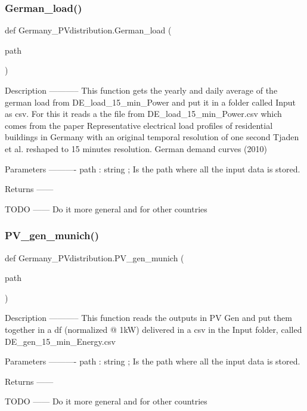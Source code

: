 \subsubsection{\texorpdfstring{German\+\_\+load()}{German\_load()}}
{\footnotesize\ttfamily def Germany\+\_\+\+P\+Vdistribution.\+German\+\_\+load (\begin{DoxyParamCaption}\item[{}]{path }\end{DoxyParamCaption})}

\begin{DoxyVerb}Description
-----------
This function gets the yearly and daily average of the german load from DE_load_15_min_Power and put it in a folder called Input as csv. For this it reads a the file from DE_load_15_min_Power.csv which comes from the paper Representative electrical load profiles of residential buildings in Germany with an original temporal resolution of one second Tjaden et al. reshaped to 15 minutes resolution. German demand curves (2010)

Parameters
----------
path : string ; Is the path where all the input data is stored.

Returns
------

TODO
------
Do it more general and for other countries
\end{DoxyVerb}
 \mbox{\label{namespace_germany___p_vdistribution_ad3081c58ad3af6f4cec1676bd4b5f585}} 
\subsubsection{\texorpdfstring{P\+V\+\_\+gen\+\_\+munich()}{PV\_gen\_munich()}}
{\footnotesize\ttfamily def Germany\+\_\+\+P\+Vdistribution.\+P\+V\+\_\+gen\+\_\+munich (\begin{DoxyParamCaption}\item[{}]{path }\end{DoxyParamCaption})}

\begin{DoxyVerb}Description
-----------
This function reads the outputs in PV Gen and put them together in a df (normalized @ 1kW) delivered in a csv in the Input folder, called DE_gen_15_min_Energy.csv

Parameters
----------
path : string ; Is the path where all the input data is stored.

Returns
------

TODO
------
Do it more general and for other countries
\end{DoxyVerb}
 \mbox{\label{namespace_germany___p_vdistribution_ac323d1a8294f56cfe777f1e54a973b8a}} 

